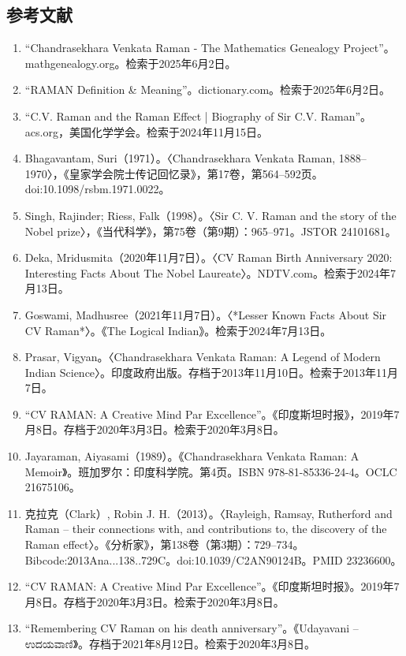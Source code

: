 \subsection{参考文献}
\begin{enumerate}
\item “Chandrasekhara Venkata Raman - The Mathematics Genealogy Project”。mathgenealogy.org。检索于2025年6月2日。
\item  “RAMAN Definition & Meaning”。dictionary.com。检索于2025年6月2日。
\item “C.V. Raman and the Raman Effect | Biography of Sir C.V. Raman”。acs.org，美国化学学会。检索于2024年11月15日。
\item Bhagavantam, Suri（1971）。〈Chandrasekhara Venkata Raman, 1888–1970〉，《皇家学会院士传记回忆录》，第17卷，第564–592页。doi:10.1098/rsbm.1971.0022。
\item Singh, Rajinder; Riess, Falk（1998）。〈Sir C. V. Raman and the story of the Nobel prize〉，《当代科学》，第75卷（第9期）：965–971。JSTOR 24101681。
\item Deka, Mridusmita（2020年11月7日）。〈CV Raman Birth Anniversary 2020: Interesting Facts About The Nobel Laureate〉。NDTV.com。检索于2024年7月13日。
\item Goswami, Madhusree（2021年11月7日）。〈*Lesser Known Facts About Sir CV Raman*〉。《The Logical Indian》。检索于2024年7月13日。
\item Prasar, Vigyan。〈Chandrasekhara Venkata Raman: A Legend of Modern Indian Science〉。印度政府出版。存档于2013年11月10日。检索于2013年11月7日。
\item “CV RAMAN: A Creative Mind Par Excellence”。《印度斯坦时报》，2019年7月8日。存档于2020年3月3日。检索于2020年3月8日。
\item Jayaraman, Aiyasami（1989）。《Chandrasekhara Venkata Raman: A Memoir》。班加罗尔：印度科学院。第4页。ISBN 978-81-85336-24-4。OCLC 21675106。
\item 克拉克（Clark）, Robin J. H.（2013）。〈Rayleigh, Ramsay, Rutherford and Raman – their connections with, and contributions to, the discovery of the Raman effect〉。《分析家》，第138卷（第3期）：729–734。Bibcode:2013Ana...138..729C。doi:10.1039/C2AN90124B。PMID 23236600。
\item “CV RAMAN: A Creative Mind Par Excellence”。《印度斯坦时报》。2019年7月8日。存档于2020年3月3日。检索于2020年3月8日。
\item “Remembering CV Raman on his death anniversary”。《Udayavani – ಉದಯವಾಣಿ》。存档于2021年8月12日。检索于2020年3月8日。

\end{enumerate}
